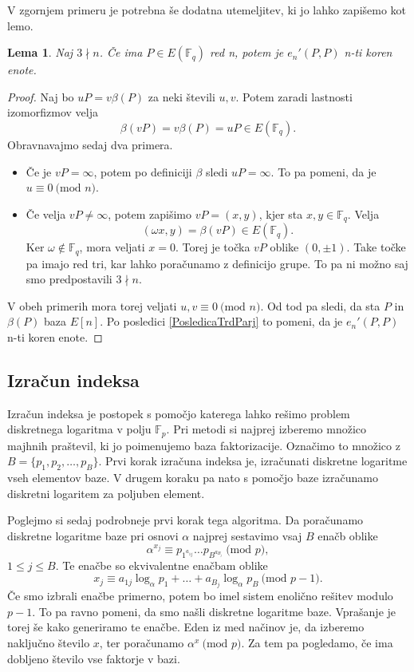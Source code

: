 \documentclass[12pt,a4paper,twoside]{article}
\theoremstyle{definition} %
\theoremstyle{plain} %
\newtheorem{lema}[definicija]{Lema}
\numberwithin{equation}{section}  %
\newcommand{\F}{\mathbb F}
\newcommand{\E}[1]{E({#1})}
\newcommand{\MOD}[1]{\ \text{(mod }{#1}\text{)}}
\begin{document}
V zgornjem primeru je potrebna še dodatna utemeljitev, ki jo lahko zapišemo kot lemo.

\begin{lema}
\label{lema:6.1}
Naj $3 \nmid n$. Če ima $P \in \E{\F_q}$ red n, potem je $e_n'(P,P)$ n-ti koren enote.
\end{lema}

\begin{proof}
Naj bo $uP = v\beta(P)$ za neki števili $u,v$. Potem zaradi lastnosti izomorfizmov velja
$$\beta(vP) = v\beta(P) = uP \in \E{\F_q}.$$
Obravnavajmo sedaj dva primera.
\begin{itemize}
\item Če je $vP = \infty$, potem po definiciji $\beta$ sledi $uP = \infty$. To pa pomeni, da je $u \equiv 0 \MOD{n}$.
\item Če velja $vP \neq \infty$, potem zapišimo $vP = (x,y)$, kjer sta $x,y \in \F_q$. Velja
$$(\omega x,y) = \beta(vP) \in \E{\F_q}.$$
Ker $\omega \notin \F_q$, mora veljati $x = 0$. Torej je točka $vP$ oblike $(0,\pm 1)$. Take točke pa imajo red tri, kar lahko poračunamo z definicijo grupe. To pa ni možno saj smo predpostavili $3 \nmid n$.
\end{itemize}

V obeh primerih mora torej veljati $u,v \equiv 0 \MOD{n}$. Od tod pa sledi, da sta $P$ in $\beta(P)$ baza $E[n]$. Po posledici \ref{PosledicaTrdParj} to pomeni, da je $e_n'(P,P)$ n-ti koren enote.

\end{proof}



\subsection{Izračun indeksa}
\label{IndexCalc}

Izračun indeksa je postopek s pomočjo katerega lahko rešimo problem diskretnega logaritma v polju $\F_p$.
Pri metodi si najprej izberemo množico majhnih praštevil, ki jo poimenujemo baza faktorizacije. Označimo to množico z $B = \{ p_1,p_2, \ldots, p_B \}$. Prvi korak izračuna indeksa je, izračunati diskretne logaritme vseh elementov baze. V drugem koraku pa nato s pomočjo baze izračunamo diskretni logaritem za poljuben element.

Poglejmo si sedaj podrobneje prvi korak tega algoritma. Da poračunamo diskretne logaritme baze pri osnovi $\alpha$ najprej sestavimo vsaj $B$ enačb oblike
$$\alpha^{x_j} \equiv p_{1^{a_{1j}}}\ldots p_{B^{a_{B_j}}} \MOD{p},$$
$1\leq j \leq B.$
Te enačbe so ekvivalentne enačbam oblike
$$x_j \equiv a_{1j}\log_{\alpha}p_1 + \ldots + a_{B_j}\log_{\alpha}p_B \MOD{p-1}.$$
Če smo izbrali enačbe primerno, potem bo imel sistem enolično rešitev modulo $p-1$. To pa ravno pomeni, da smo našli diskretne logaritme baze. Vprašanje je torej še kako generiramo te enačbe. Eden iz med načinov je, da izberemo naključno število $x$, ter poračunamo $\alpha^x \MOD{p}$. Za tem pa pogledamo, če ima dobljeno število vse faktorje v bazi.
\end{document}
